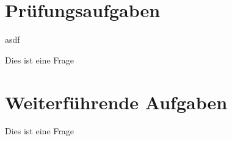 \documentclass[a4paper,12pt]{article}
\begin{document}
\section{Prüfungsaufgaben}

asdf

\begin{question}
	Dies ist eine Frage
\end{question}


\section{Weiterführende Aufgaben}

\begin{question}
	Dies ist eine Frage
\end{question}
\end{document}

